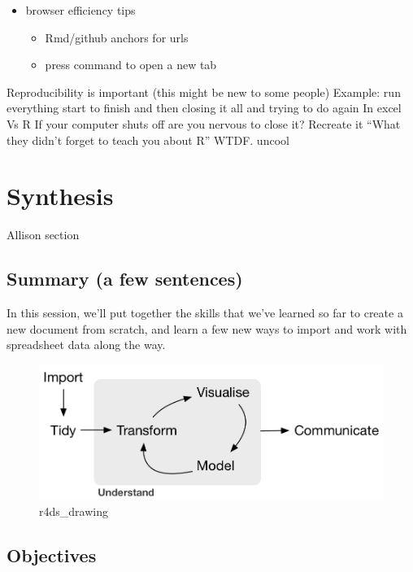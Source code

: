 \documentclass[]{book}
\providecommand{\tightlist}{%
  \setlength{\itemsep}{0pt}\setlength{\parskip}{0pt}}
\begin{document}
\begin{itemize}
\tightlist
\item
  browser efficiency tips

  \begin{itemize}
  \tightlist
  \item
    Rmd/github anchors for urls
  \item
    press command to open a new tab
  \end{itemize}
\end{itemize}

Reproducibility is important (this might be new to some people)
Example: run everything start to finish and then closing it all and trying to do again
In excel
Vs R
If your computer shuts off are you nervous to close it?
Recreate it
``What they didn't forget to teach you about R'' WTDF. uncool

\hypertarget{synthesis}{%
\chapter{Synthesis}\label{synthesis}}

Allison section

\hypertarget{summary-a-few-sentences-6}{%
\section{Summary (a few sentences)}\label{summary-a-few-sentences-6}}

In this session, we'll put together the skills that we've learned so far to create a new document from scratch, and learn a few new ways to import and work with spreadsheet data along the way.

\begin{figure}
\centering
\includegraphics{img/r4ds_data-science.png}
\caption{r4ds\_drawing}
\end{figure}

\hypertarget{objectives-4}{%
\section{Objectives}\label{objectives-4}}
\end{document}
